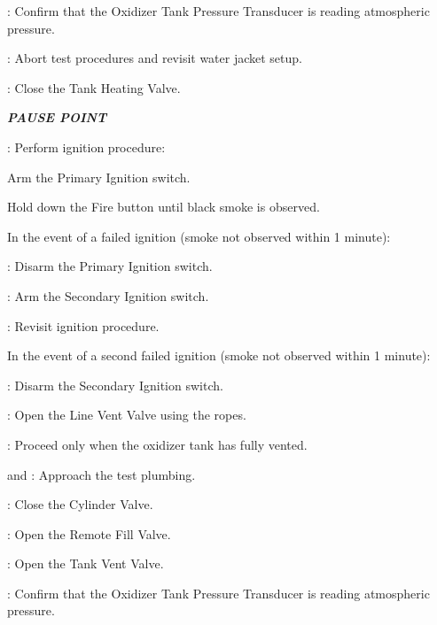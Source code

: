 \begin{checklist}
\begin{checklist}[label=$\bullet$]
\begin{checklist}
            \item \daq{}: Confirm that the Oxidizer Tank Pressure Transducer is reading atmospheric pressure.
            \item \ops{}: Abort test procedures and revisit water jacket setup.
        \end{checklist}
    \end{checklist}
    \item \heat: Close the Tank Heating Valve.
    \item \textbf{\textit{PAUSE POINT}}
    \item \primary{}: Perform ignition procedure:
    \begin{checklist}
        \item Arm the Primary Ignition switch.
        \item Hold down the Fire button until black smoke is observed.
        \begin{checklist}[label=$\bullet$]
            \item In the event of a failed ignition (smoke not observed within 1 minute):
            \begin{checklist}
                \item \primary: Disarm the Primary Ignition switch.
                \item \primary: Arm the Secondary Ignition switch.
                \item \ops: Revisit ignition procedure.
            \end{checklist}
            \item In the event of a second failed ignition (smoke not observed within 1 minute):
            \begin{checklist}
                \item \primary: Disarm the Secondary Ignition switch.
                \item \primary: Open the Line Vent Valve using the ropes.
                \item \ops: Proceed only when the oxidizer tank has fully vented.
                \item \primary{} and \secondary: Approach the test plumbing.
                \item \primary{}: Close the Cylinder Valve.
                \item \primary{}: Open the Remote Fill Valve.
                \item \primary{}: Open the Tank Vent Valve.
                \item \daq{}: Confirm that the Oxidizer Tank Pressure Transducer is reading atmospheric pressure.

\end{checklist}
\end{checklist}
\end{checklist}
\end{checklist}
